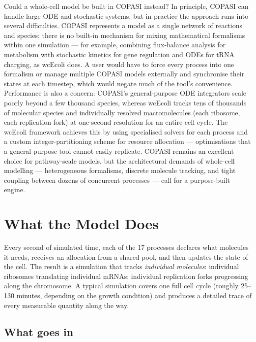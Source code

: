 \documentclass[11pt,a4paper]{article}
\begin{document}
Could a whole-cell model be built in COPASI instead?  In principle, COPASI can
handle large ODE and stochastic systems, but in practice the approach runs into
several difficulties.  COPASI represents a model as a single network of
reactions and species; there is no built-in mechanism for mixing mathematical
formalisms within one simulation --- for example, combining flux-balance
analysis for metabolism with stochastic kinetics for gene regulation and ODEs
for tRNA charging, as wcEcoli does.  A user would have to force every process
into one formalism or manage multiple COPASI models externally and synchronise
their states at each timestep, which would negate much of the tool's
convenience.  Performance is also a concern: COPASI's general-purpose ODE
integrators scale poorly beyond a few thousand species, whereas wcEcoli tracks
tens of thousands of molecular species and individually resolved macromolecules
(each ribosome, each replication fork) at one-second resolution for an entire
cell cycle.  The wcEcoli framework achieves this by using specialised solvers
for each process and a custom integer-partitioning scheme for resource
allocation --- optimisations that a general-purpose tool cannot easily
replicate.  COPASI remains an excellent choice for pathway-scale models, but the
architectural demands of whole-cell modelling --- heterogeneous formalisms,
discrete molecule tracking, and tight coupling between dozens of concurrent
processes --- call for a purpose-built engine.


\section{What the Model Does}

Every second of simulated time, each of the 17 processes declares what
molecules it needs, receives an allocation from a shared pool, and then
updates the state of the cell.  The result is a simulation that
tracks \emph{individual molecules}: individual ribosomes translating
individual mRNAs; individual replication forks progressing along the
chromosome.  A typical simulation covers one full cell cycle (roughly 25--130
minutes, depending on the growth condition) and produces a detailed trace of
every measurable quantity along the way.

\subsection{What goes in}
\end{document}
